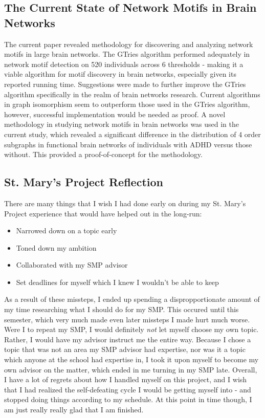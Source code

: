 \subsection{The Current State of Network Motifs in Brain Networks}
The current paper revealed methodology for discovering and analyzing network motifs in large brain networks. The GTries algorithm performed adequately in network motif detection on 520 individuals across 6 thresholds - making it a viable algorithm for motif discovery in brain networks, especially given its reported running time. Suggestions were made to further improve the GTries algorithm specifically in the realm of brain networks research. Current algorithms in graph isomorphism seem to outperform those used in the GTries algorithm, however, successful implementation would be needed as proof. A novel methodology in studying network motifs in brain networks was used in the current study, which revealed a significant difference in the distribution of 4 order subgraphs in functional brain networks of individuals with ADHD versus those without. This provided a proof-of-concept for the methodology. 
\subsection{St. Mary's Project Reflection}
There are many things that I wish I had done early on during my St. Mary's Project experience that would have helped out in the long-run:
\begin{itemize}
\item{Narrowed down on a topic early}
\item{Toned down my ambition}
\item{Collaborated with my SMP advisor}
\item{Set deadlines for myself which I knew I wouldn't be able to keep}
\end{itemize}
As a result of these missteps, I ended up spending a dispropportionate amount of my time researching what I should do for my SMP. This occured until this semester, which very much made even later missteps I made hurt much worse. Were I to repeat my SMP, I would definitely \textit{not} let myself choose my own topic. Rather, I would have my advisor instruct me the entire way. Because I chose a topic that was not an area my SMP advisor had expertise, nor was it a topic which anyone at the school had expertise in, I took it upon myself to become my own advisor on the matter, which ended in me turning in my SMP late. Overall, I have a lot of regrets about how I handled myself on this project, and I wish that I had realized the self-defeating cycle I would be getting myself into - and stopped doing things according to my schedule. At this point in time though, I am just really really glad that I am finished. 